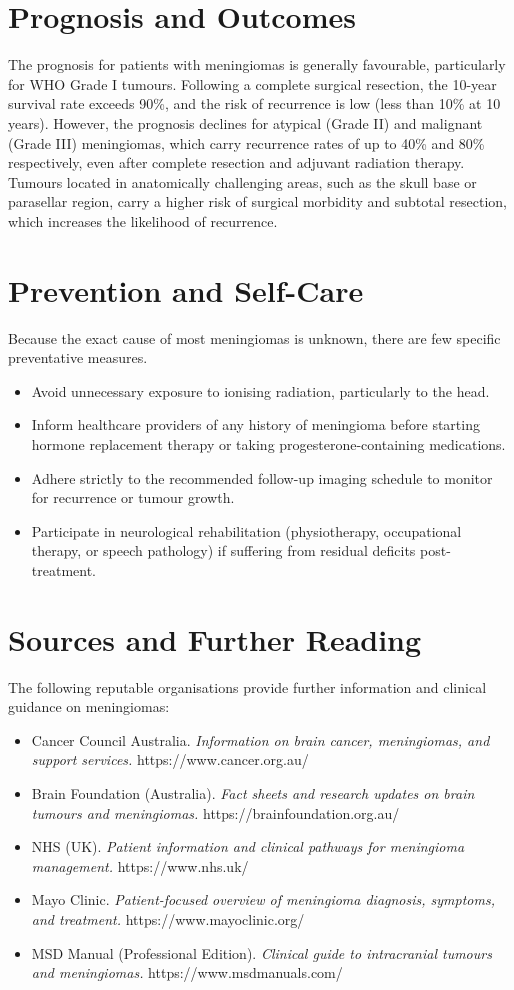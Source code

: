 \section*{Prognosis and Outcomes}
The prognosis for patients with meningiomas is generally favourable, particularly for WHO Grade I tumours. Following a complete surgical resection, the 10-year survival rate exceeds 90\%, and the risk of recurrence is low (less than 10\% at 10 years). However, the prognosis declines for atypical (Grade II) and malignant (Grade III) meningiomas, which carry recurrence rates of up to 40\% and 80\% respectively, even after complete resection and adjuvant radiation therapy. Tumours located in anatomically challenging areas, such as the skull base or parasellar region, carry a higher risk of surgical morbidity and subtotal resection, which increases the likelihood of recurrence.

\section*{Prevention and Self-Care}
Because the exact cause of most meningiomas is unknown, there are few specific preventative measures.
\begin{itemize}
    \item Avoid unnecessary exposure to ionising radiation, particularly to the head.
    \item Inform healthcare providers of any history of meningioma before starting hormone replacement therapy or taking progesterone-containing medications.
    \item Adhere strictly to the recommended follow-up imaging schedule to monitor for recurrence or tumour growth.
    \item Participate in neurological rehabilitation (physiotherapy, occupational therapy, or speech pathology) if suffering from residual deficits post-treatment.
\end{itemize}

\section*{Sources and Further Reading}
The following reputable organisations provide further information and clinical guidance on meningiomas:
\begin{itemize}
    \item Cancer Council Australia. \textit{Information on brain cancer, meningiomas, and support services.} https://www.cancer.org.au/
    \item Brain Foundation (Australia). \textit{Fact sheets and research updates on brain tumours and meningiomas.} https://brainfoundation.org.au/
    \item NHS (UK). \textit{Patient information and clinical pathways for meningioma management.} https://www.nhs.uk/
    \item Mayo Clinic. \textit{Patient-focused overview of meningioma diagnosis, symptoms, and treatment.} https://www.mayoclinic.org/
    \item MSD Manual (Professional Edition). \textit{Clinical guide to intracranial tumours and meningiomas.} https://www.msdmanuals.com/
\end{itemize}
